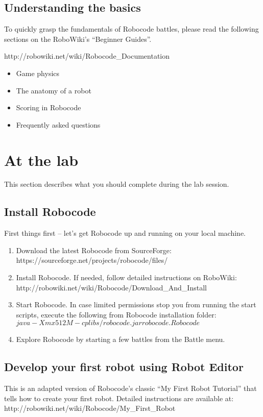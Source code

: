 \documentclass{scrreprt}
\begin{document}
\section{Understanding the basics}
To quickly grasp the fundamentals of Robocode battles, please read the following sections on the RoboWiki's ``Beginner Guides''. 

http://robowiki.net/wiki/Robocode\_Documentation
\begin{itemize}
\item Game physics
\item The anatomy of a robot
\item Scoring in Robocode
\item Frequently asked questions
\end{itemize}

\chapter{At the lab}
This section describes what you should complete during the lab session.

\section{Install Robocode} \label{sec:install}
First things first -- let's get Robocode up and running on your local machine.

\begin{enumerate}
\item Download the latest Robocode from SourceForge:\\https://sourceforge.net/projects/robocode/files/
\item Install Robocode. If needed, follow detailed instructions on RoboWiki:\\http://robowiki.net/wiki/Robocode/Download\_And\_Install
\item Start Robocode. In case limited permissions stop you from running the start scripts, execute the following from Robocode installation folder:\\
$java -Xmx512M -cp libs/robocode.jar robocode.Robocode$
\item Explore Robocode by starting a few battles from the Battle menu.
\end{enumerate}

\section{Develop your first robot using Robot Editor} \label{sec:myfirstrobot}
This is an adapted version of Robocode's classic ``My First Robot Tutorial'' that tells how to create your first robot. Detailed instructions are available at:\\http://robowiki.net/wiki/Robocode/My\_First\_Robot
\end{document}
